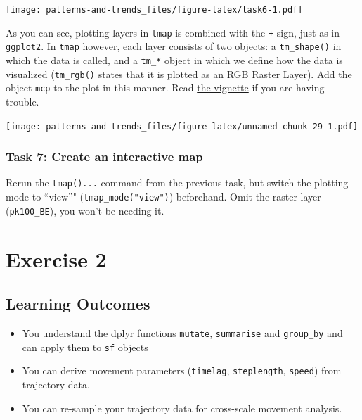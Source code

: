 \documentclass[]{book}
\providecommand{\tightlist}{%
  \setlength{\itemsep}{0pt}\setlength{\parskip}{0pt}}
\begin{document}
\texttt{[image: patterns-and-trends\_files/figure-latex/task6-1.pdf]}

As you can see, plotting layers in \texttt{tmap} is combined with the \texttt{+} sign, just as in \texttt{ggplot2}. In \texttt{tmap} however, each layer consists of two objects: a \texttt{tm\_shape()} in which the data is called, and a \texttt{tm\_*} object in which we define how the data is visualized (\texttt{tm\_rgb()} states that it is plotted as an RGB Raster Layer). Add the object \texttt{mcp} to the plot in this manner. Read \href{https://cran.r-project.org/web/packages/tmap/vignettes/tmap-getstarted.html}{the vignette} if you are having trouble.

\texttt{[image: patterns-and-trends\_files/figure-latex/unnamed-chunk-29-1.pdf]}

\hypertarget{task-7-create-an-interactive-map}{%
\subsection{Task 7: Create an interactive map}\label{task-7-create-an-interactive-map}}

Rerun the \texttt{tmap()...} command from the previous task, but switch the plotting mode to ``view''" (\texttt{tmap\_mode("view")}) beforehand. Omit the raster layer (\texttt{pk100\_BE}), you won't be needing it.

\hypertarget{exercise-2}{%
\chapter{Exercise 2}\label{exercise-2}}

\hypertarget{learning-outcomes}{%
\section{Learning Outcomes}\label{learning-outcomes}}

\begin{itemize}
\tightlist
\item
  You understand the dplyr functions \texttt{mutate}, \texttt{summarise} and \texttt{group\_by} and can apply them to \texttt{sf} objects
\item
  You can derive movement parameters (\texttt{timelag}, \texttt{steplength}, \texttt{speed}) from trajectory data.
\item
  You can re-sample your trajectory data for cross-scale movement analysis.
\end{itemize}
\end{document}
